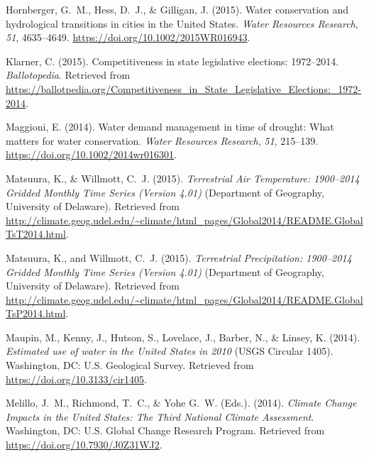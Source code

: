 \documentclass[draft,linenumbers]{agujournal}
\begin{document}
\begin{thebibliography}{33}
  Hornberger, G.~M., Hess, D.~J., \& Gilligan, J. (2015).
  Water conservation and hydrological transitions in cities in the {U}nited {S}tates.
  \textit{Water Resources Research}, \textit{51}, 4635--4649.
  \url{https://doi.org/10.1002/2015WR016943}.

  Klarner, C. (2015).
  Competitiveness in state legislative elections: 1972--2014.
  \textit{Ballotopedia}.
  Retrieved from
  \url{https://ballotpedia.org/Competitiveness_in_State_Legislative_Elections:_1972-2014}.

  Maggioni, E. (2014).
  Water demand management in time of drought: {W}hat matters for water conservation.
  \textit{Water Resources Research}, \textit{51}, 215--139.
  \url{https://doi.org/10.1002/2014wr016301}.

  Matsuura, K., \& Willmott, C.~J. (2015{}).
  \textit{Terrestrial Air Temperature: 1900--2014 Gridded Monthly Time Series (Version 4.01)\/}
  (Department of  Geography, University of Delaware).
  Retrieved from
  \url{http://climate.geog.udel.edu/~climate/html_pages/Global2014/README.GlobalTsT2014.html}.

  Matsuura, K., and Willmott, C.~J. (2015{}).
  \textit{Terrestrial Precipitation: 1900--2014 Gridded Monthly Time Series (Version 4.01)\/}
  (Department of  Geography, University of Delaware).
  Retrieved from
  \url{http://climate.geog.udel.edu/~climate/html_pages/Global2014/README.GlobalTsP2014.html}.

  Maupin, M., Kenny, J., Hutson, S., Lovelace, J., Barber, N., \& Linsey, K. (2014).
  \textit{Estimated use of water in the {U}nited {S}tates in 2010\/}
  (USGS Circular 1405).
  Washington, DC: U.S. Geological Survey.
  Retrieved from
  \url{https://doi.org/10.3133/cir1405}.

  Melillo, J.~M., Richmond, T.~C., \&  Yohe G.~W. (Eds.). (2014).
  \textit{Climate Change Impacts in the {U}nited {S}tates: {T}he Third National Climate
  Assessment}.
  Washington, DC: U.S. Global Change Research Program.
  Retrieved from \url{https://doi.org/10.7930/J0Z31WJ2}.


\end{thebibliography}
\end{document}
